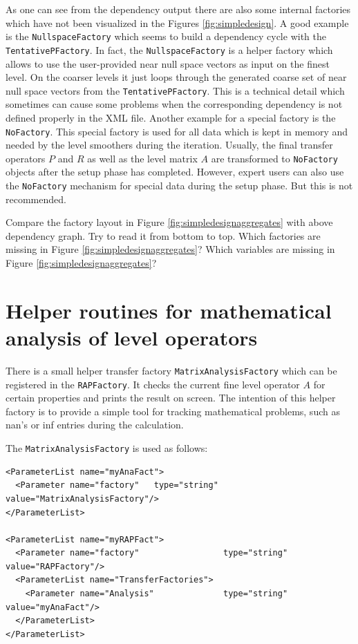 \documentclass[10pt,fleqn]{book}
\begin{document}
As one can see from the dependency output there are also some internal factories which have not been visualized in the Figures \ref{fig:simpledesign}. A good example is the \verb|NullspaceFactory| which seems to build a dependency cycle with the \verb|TentativePFactory|. In fact, the \verb|NullspaceFactory| is a helper factory which allows to use the user-provided near null space vectors as input on the finest level. On the coarser levels it just loops through the generated coarse set of near null space vectors from the \verb|TentativePFactory|. This is a technical detail which sometimes can cause some problems when the corresponding dependency is not defined properly in the XML file.
Another example for a special factory is the \verb|NoFactory|. This special factory is used for all data which is kept in memory and needed by the level smoothers during the iteration. Usually, the final transfer operators $P$ and $R$ as well as the level matrix $A$ are transformed to \verb|NoFactory| objects after the setup phase has completed. However, expert users can also use the \verb|NoFactory| mechanism for special data during the setup phase. But this is not recommended.

\begin{exercise}
Compare the factory layout in Figure \ref{fig:simpledesignaggregates} with above dependency graph. Try to read it from bottom to top. Which factories are missing in Figure \ref{fig:simpledesignaggregates}? Which variables are missing in Figure \ref{fig:simpledesignaggregates}?
\end{exercise}

\section{Helper routines for mathematical analysis of level operators}

There is a small helper transfer factory \verb|MatrixAnalysisFactory| which can be registered in the \verb|RAPFactory|. It checks the current fine level operator $A$ for certain properties and prints the result on screen. The intention of this helper factory is to provide a simple tool for tracking mathematical problems, such as nan's or inf entries during the calculation.

The \verb|MatrixAnalysisFactory| is used as follows:
\begin{lstlisting}
<ParameterList name="myAnaFact">
  <Parameter name="factory"   type="string" value="MatrixAnalysisFactory"/>
</ParameterList>

<ParameterList name="myRAPFact">
  <Parameter name="factory"                 type="string" value="RAPFactory"/>
  <ParameterList name="TransferFactories">
    <Parameter name="Analysis"              type="string" value="myAnaFact"/>
  </ParameterList>
</ParameterList>
\end{lstlisting}
\end{document}
